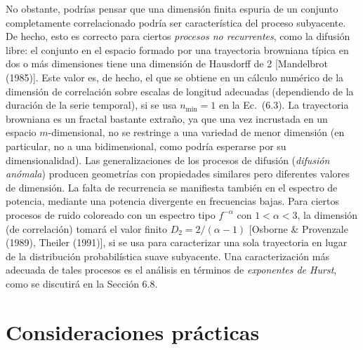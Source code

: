 \documentclass[10pt,a4paper]{book}
\begin{document}
\bigskip

No obstante, podrías pensar que una dimensión finita espuria de un conjunto completamente correlacionado podría ser característica del proceso subyacente. De hecho, esto es correcto para ciertos \textit{procesos no recurrentes}, como la difusión libre: el conjunto en el espacio formado por una trayectoria browniana típica en dos o más dimensiones tiene una dimensión de Hausdorff de 2 [Mandelbrot (1985)]. Este valor es, de hecho, el que se obtiene en un cálculo numérico de la dimensión de correlación sobre escalas de longitud adecuadas (dependiendo de la duración de la serie temporal), si se usa $n_{\min} = 1$ en la Ec.~(6.3). La trayectoria browniana es un fractal bastante extraño, ya que una vez incrustada en un espacio $m$-dimensional, no se restringe a una variedad de menor dimensión (en particular, no a una bidimensional, como podría esperarse por su dimensionalidad). Las generalizaciones de los procesos de difusión (\textit{difusión anómala}) producen geometrías con propiedades similares pero diferentes valores de dimensión. La falta de recurrencia se manifiesta también en el espectro de potencia, mediante una potencia divergente en frecuencias bajas. Para ciertos procesos de ruido coloreado con un espectro tipo $f^{-\alpha}$ con $1 < \alpha < 3$, la dimensión (de correlación) tomará el valor finito $D_2 = 2 / (\alpha - 1)$ [Osborne \& Provenzale (1989), Theiler (1991)], si se usa para caracterizar una sola trayectoria en lugar de la distribución probabilística suave subyacente. Una caracterización más adecuada de tales procesos es el análisis en términos de \textit{exponentes de Hurst}, como se discutirá en la Sección 6.8.

\newpage

\section{Consideraciones prácticas}
\end{document}
